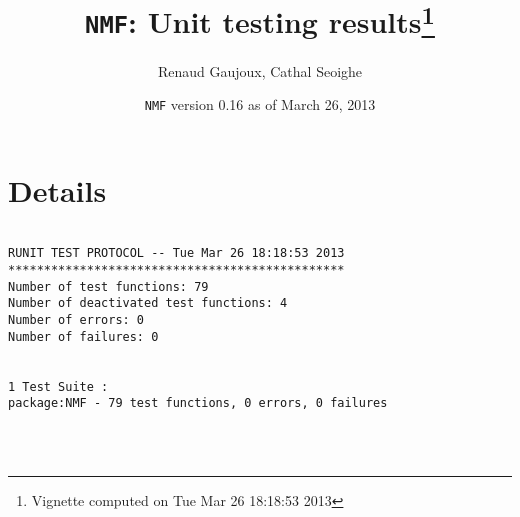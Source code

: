 \documentclass[10pt]{article}
\author{Renaud Gaujoux, Cathal Seoighe}
\title{\texttt{NMF}: Unit testing results\footnote{Vignette computed  on Tue Mar 26 18:18:53 2013}}
\date{\texttt{NMF} version 0.16 as of March 26, 2013}
\begin{document}
\maketitle

\section{Details}
\begin{verbatim}

RUNIT TEST PROTOCOL -- Tue Mar 26 18:18:53 2013 
*********************************************** 
Number of test functions: 79 
Number of deactivated test functions: 4 
Number of errors: 0 
Number of failures: 0 

 
1 Test Suite : 
package:NMF - 79 test functions, 0 errors, 0 failures




\end{verbatim}
\end{document}
